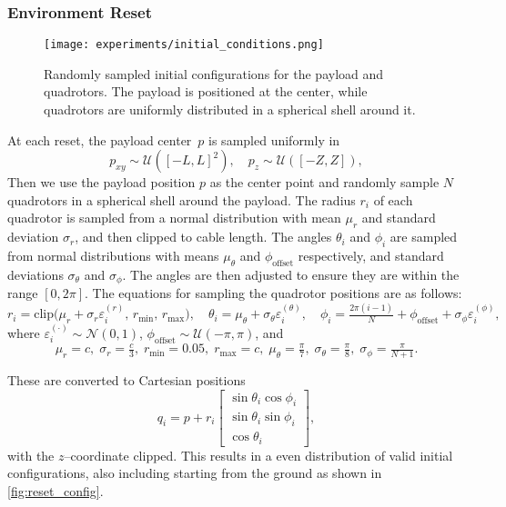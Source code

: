 \subsubsection{Environment Reset}
\label{sec:reset}
\begin{figure}
    \centering
    \texttt{[image: experiments/initial\_conditions.png]}
    \caption{Randomly sampled initial configurations for the payload and quadrotors. The payload is positioned at the center, while quadrotors are uniformly distributed in a spherical shell around it.}
    \label{fig:reset_config}
\end{figure}
At each reset, the payload center~$p$ is sampled uniformly in
\[
p_{xy}\sim\mathcal{U}([-L,L]^2),\quad p_z\sim\mathcal{U}([-Z,Z]),
\]
Then we use the payload position $p$ as the center point and randomly sample $N$ quadrotors in a spherical shell around the payload. The radius $r_i$ of each quadrotor is sampled from a normal distribution with mean $\mu_r$ and standard deviation $\sigma_r$, and then clipped to cable length. The angles $\theta_i$ and $\phi_i$ are sampled from normal distributions with means $\mu_\theta$ and $\phi_{\mathrm{offset}}$ respectively, and standard deviations $\sigma_\theta$ and $\sigma_\phi$. The angles are then adjusted to ensure they are within the range $[0, 2\pi]$. The equations for sampling the quadrotor positions are as follows:
\[
r_i = \mathrm{clip}\bigl(\mu_r+\sigma_r\varepsilon_i^{(r)},\,r_{\min},\,r_{\max}\bigr),\quad
\theta_i = \mu_\theta+\sigma_\theta\varepsilon_i^{(\theta)},\quad
\phi_i = \tfrac{2\pi(i-1)}{N} + \phi_{\mathrm{offset}} + \sigma_\phi\varepsilon_i^{(\phi)},
\]
where $\varepsilon_i^{(\cdot)}\!\sim\mathcal{N}(0,1)$, $\phi_{\mathrm{offset}}\!\sim\mathcal{U}(-\pi,\pi)$, and
\[
\mu_r=c,\;\sigma_r=\tfrac{c}{3},\;r_{\min}=0.05,\;r_{\max}=c,\;
\mu_\theta=\tfrac{\pi}{7},\;\sigma_\theta=\tfrac{\pi}{8},\;\sigma_\phi=\tfrac{\pi}{N+1}.
\]

These are converted to Cartesian positions
\[
q_i = p + r_i
\begin{bmatrix}
\sin\theta_i\cos\phi_i\\
\sin\theta_i\sin\phi_i\\
\cos\theta_i
\end{bmatrix},
\]
with the $z$–coordinate clipped. 
This results in a even distribution of valid initial configurations, also including starting from the ground as shown in \autoref{fig:reset_config}. 



